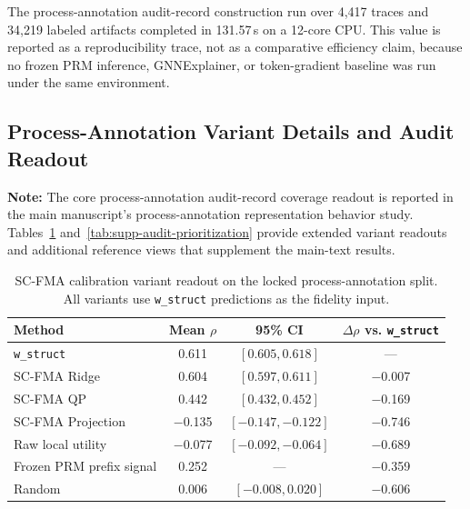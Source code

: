 \documentclass[pdflatex,sn-mathphys-num]{sn-jnl}
\begin{document}
The process-annotation audit-record construction run over 4,417 traces and 34,219 labeled artifacts completed in 131.57\,s on a 12-core CPU. This value is reported as a reproducibility trace, not as a comparative efficiency claim, because no frozen PRM inference, GNNExplainer, or token-gradient baseline was run under the same environment.

\subsection{Process-Annotation Variant Details and Audit Readout}
\label{app:prm800k-variant-details}

\noindent\textbf{Note:} The core process-annotation audit-record coverage readout is reported in the main manuscript's process-annotation representation behavior study. Tables~\ref{tab:supp-scfma-variants} and~\ref{tab:supp-audit-prioritization} provide extended variant readouts and additional reference views that supplement the main-text results.

\begin{table}[ht]
\caption{SC-FMA calibration variant readout on the locked process-annotation split. All variants use \texttt{w\_struct} predictions as the fidelity input.}
\label{tab:supp-scfma-variants}
\centering
\small
\begin{tabular}{lccc}
\toprule
\textbf{Method} & \textbf{Mean $\rho$} & \textbf{95\% CI} & \textbf{$\Delta\rho$ vs. \texttt{w\_struct}} \\
\midrule
\texttt{w\_struct} & 0.611 & $[0.605,0.618]$ & --- \\
SC-FMA Ridge & 0.604 & $[0.597,0.611]$ & $-$0.007 \\
SC-FMA QP & 0.442 & $[0.432,0.452]$ & $-$0.169 \\
SC-FMA Projection & $-$0.135 & $[-0.147,-0.122]$ & $-$0.746 \\
Raw local utility & $-$0.077 & $[-0.092,-0.064]$ & $-$0.689 \\
Frozen PRM prefix signal & 0.252 & --- & $-$0.359 \\
Random & 0.006 & $[-0.008,0.020]$ & $-$0.606 \\
\bottomrule
\end{tabular}
\end{table}
\end{document}
